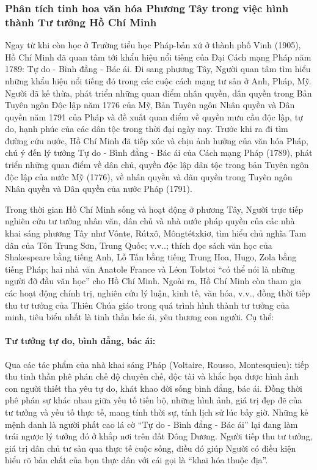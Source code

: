 \subsubsection{Phân tích tinh hoa văn hóa Phương Tây trong việc hình thành Tư tưởng Hồ Chí Minh}

Ngay từ khi còn học ở Trường tiểu học Pháp-bản xứ ở thành phố Vinh (1905), Hồ Chí Minh đã quan tâm tới khẩu hiệu nổi tiếng của Đại Cách mạng Pháp năm 1789: Tự do - Bình đẳng - Bác ái. Đi sang phương Tây, Người quan tâm tìm hiểu những khẩu hiệu nổi tiếng đó trong các cuộc cách mạng tư sản ở Anh, Pháp, Mỹ. Người đã kế thừa, phát triển những quan điểm nhân quyền, dân quyền trong Bản Tuyên ngôn Độc lập năm 1776 của Mỹ, Bản Tuyên ngôn Nhân quyền và Dân quyền năm 1791 của Pháp và đề xuất quan điểm về quyền mưu cầu độc lập, tự do, hạnh phúc của các dân tộc trong thời đại ngày nay. Trước khi ra đi tìm đường cứu nước, Hồ Chí Minh đã tiếp xúc và chịu ảnh hưởng của văn hóa Pháp, chú ý đến lý tưởng Tự do - Bình đẳng - Bác ái của Cách mạng Pháp (1789), phát triển những quan điểm về dân chủ, quyền độc lập dân tộc trong bản Tuyên ngôn độc lập của nước Mỹ (1776), về nhân quyền và dân quyền trong Tuyên ngôn Nhân quyền và Dân quyền của nước Pháp (1791).

Trong thời gian Hồ Chí Minh sống và hoạt động ở phương Tây, Người trực tiếp nghiên cứu tư tưởng nhân văn, dân chủ và nhà nước pháp quyền của các nhà khai sáng phương Tây như Vônte, Rútxô, Môngtétxkiơ, tìm hiểu chủ nghĩa Tam dân của Tôn Trung Sơn, Trung Quốc; v.v..; thích đọc sách văn học của Shakespeare bằng tiếng Anh, Lỗ Tấn bằng tiếng Trung Hoa, Hugo, Zola bằng tiếng Pháp; hai nhà văn Anatole France và Léon Tolstoi “có thể nói là những người đỡ đầu văn học” cho Hồ Chí Minh. Ngoài ra, Hồ Chí Minh còn tham gia các hoạt động chính trị, nghiên cứu lý luận, kinh tế, văn hóa, v.v., đồng thời tiếp thu tư tưởng của Thiên Chúa giáo trong quá trình hình thành tư tưởng của minh, tiêu biểu nhất là tinh thần bác ái, yêu thương con người. Cụ thể:

\paragraph{Tư tưởng tự do, bình đẳng, bác ái:}
Qua các tác phẩm của nhà khai sáng Pháp (Voltaire, Rousso, Montesquieu): tiếp thu tinh thần phê phán chế độ chuyên chế, độc tài và khắc họa được hình ảnh con người thiết tha yêu tự do, khát khao đời sống bình đẳng, bác ái. Đồng thời phê phán sự khác nhau giữa yếu tố tiến bộ, những hình ảnh, giá trị đẹp đẽ của tư tưởng và yếu tố thực tế, mang tính thời sự, tính lịch sử lúc bấy giờ. Những kẻ mệnh danh là người phất cao lá cờ “Tự do - Bình đẳng - Bác ái” lại đang làm trái ngược lý tưởng đó ở khắp nơi trên đất Đông Dương. Người tiếp thu tư tưởng, giá trị dân chủ tư sản qua thực tế cuộc sống, điều đó giúp Người có điều kiện hiểu rõ bản chất của bọn thực dân với cái gọi là “khai hóa thuộc địa”.

